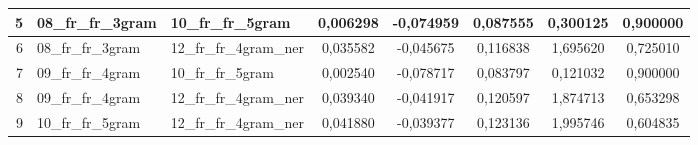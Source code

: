 \begin{table}[h!]
\begin{tabular}{|r|l|l||c|c|c|c|c|}
        5 & 08\_fr\_fr\_3gram & 10\_fr\_fr\_5gram & 0,006298 & -0,074959 & 0,087555 & 0,300125 & 0,900000 \\ \hline
        6 & 08\_fr\_fr\_3gram & 12\_fr\_fr\_4gram\_ner & 0,035582 & -0,045675 & 0,116838 & 1,695620 & 0,725010 \\ \hline
        7 & 09\_fr\_fr\_4gram & 10\_fr\_fr\_5gram & 0,002540 & -0,078717 & 0,083797 & 0,121032 & 0,900000 \\ \hline
        8 & 09\_fr\_fr\_4gram & 12\_fr\_fr\_4gram\_ner & 0,039340 & -0,041917 & 0,120597 & 1,874713 & 0,653298 \\ \hline
        9 & 10\_fr\_fr\_5gram & 12\_fr\_fr\_4gram\_ner & 0,041880 & -0,039377 & 0,123136 & 1,995746 & 0,604835 \\ \hline
    \end{tabular}
\end{table}
\newpage